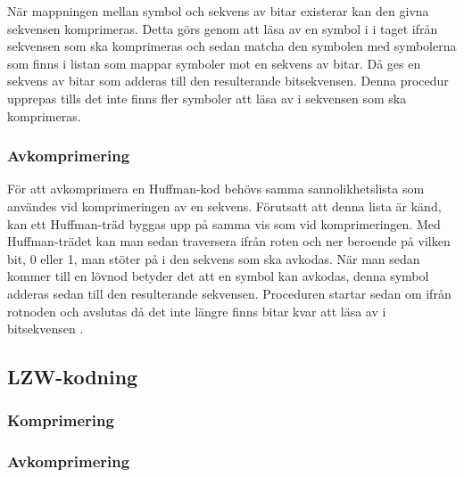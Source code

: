 	När mappningen mellan symbol och sekvens av bitar existerar kan den givna sekvensen komprimeras. Detta görs genom att läsa av en symbol i i taget ifrån sekvensen som ska komprimeras och sedan matcha den symbolen med symbolerna som finns i listan som mappar symboler mot en sekvens av bitar. Då ges en sekvens av bitar som adderas till den resulterande bitsekvensen. Denna procedur upprepas tills det inte finns fler symboler att läsa av i sekvensen som ska komprimeras.  
	\subsubsection{Avkomprimering}
	För att avkomprimera en Huffman-kod behövs samma sannolikhetslista som användes vid komprimeringen av en sekvens. Förutsatt att denna lista är känd, kan ett Huffman-träd byggas upp på samma vis som vid komprimeringen. Med Huffman-trädet kan man sedan traversera ifrån roten och ner beroende på vilken bit, 0 eller 1, man stöter på i den sekvens som ska avkodas. När man sedan kommer till en lövnod betyder det att en symbol kan avkodas, denna symbol adderas sedan till den resulterande sekvensen. Proceduren startar sedan om ifrån rotnoden och avslutas då det inte längre finns bitar kvar att läsa av i bitsekvensen \cite{huffmancoding2018}.
	
\subsection{LZW-kodning}


	\subsubsection{Komprimering}
 
	\subsubsection{Avkomprimering}
	

